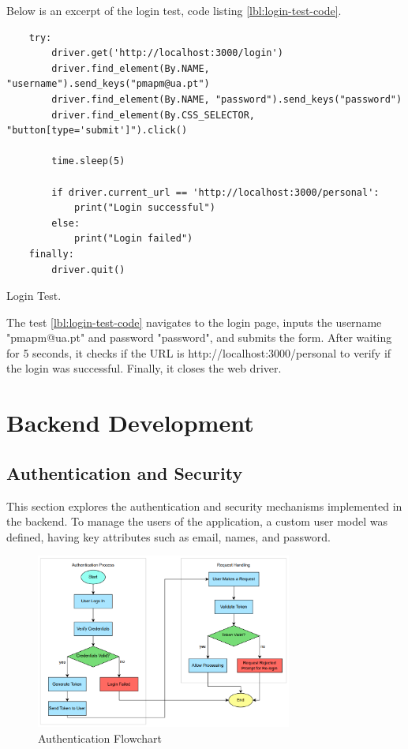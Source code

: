 Below is an excerpt of the login test, code listing \ref{lbl:login-test-code}.
\begin{listing}[h]
    \begin{verbatim}
    try:
        driver.get('http://localhost:3000/login') 
        driver.find_element(By.NAME, "username").send_keys("pmapm@ua.pt")
        driver.find_element(By.NAME, "password").send_keys("password")
        driver.find_element(By.CSS_SELECTOR, "button[type='submit']").click()

        time.sleep(5)

        if driver.current_url == 'http://localhost:3000/personal':
            print("Login successful")
        else:
            print("Login failed")
    finally:
        driver.quit()
    \end{verbatim}
    \caption{Login Test.}
    \label{lbl:login-test-code}
    \end{listing}

The test \ref{lbl:login-test-code} navigates to the login page, inputs the 
username "pmapm@ua.pt" and 
password "password", and submits the form. After waiting for 5 seconds, it checks if the URL is 
http://localhost:3000/personal to verify if the login was successful. Finally, it closes the web driver.


\section{Backend Development}
\subsection{Authentication and Security}
This section explores the authentication and security mechanisms implemented in the backend. 
To manage the users of the application, a custom user model was defined, having key attributes such as email, 
names, and password. 

\begin{figure}[h]
    \centering 
    \includegraphics[width=0.75\textwidth]{figs/flow-chart.png} 
    \caption{Authentication Flowchart}
    \label{fig:auth-flowchart}
\end{figure}

